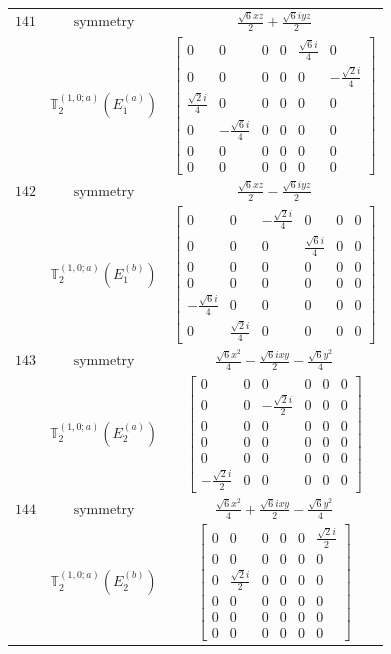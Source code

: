 \documentclass[fleqn,8pt,landscape]{jsarticle}
\begin{document}
\begin{longtable}{ccc}
$ 141 $ & $ \text{symmetry} $ & $ \frac{\sqrt{6} x z}{2} + \frac{\sqrt{6} i y z}{2} $ \\
$  $ & $ \mathbb{T}_{2}^{(1,0;a)}(E_{1}^{(a)}) $ & $ \begin{bmatrix} 0 & 0 & 0 & 0 & \frac{\sqrt{6} i}{4} & 0 \\ 0 & 0 & 0 & 0 & 0 & - \frac{\sqrt{2} i}{4} \\ \frac{\sqrt{2} i}{4} & 0 & 0 & 0 & 0 & 0 \\ 0 & - \frac{\sqrt{6} i}{4} & 0 & 0 & 0 & 0 \\ 0 & 0 & 0 & 0 & 0 & 0 \\ 0 & 0 & 0 & 0 & 0 & 0 \end{bmatrix} $ \\ \hline
$ 142 $ & $ \text{symmetry} $ & $ \frac{\sqrt{6} x z}{2} - \frac{\sqrt{6} i y z}{2} $ \\
$  $ & $ \mathbb{T}_{2}^{(1,0;a)}(E_{1}^{(b)}) $ & $ \begin{bmatrix} 0 & 0 & - \frac{\sqrt{2} i}{4} & 0 & 0 & 0 \\ 0 & 0 & 0 & \frac{\sqrt{6} i}{4} & 0 & 0 \\ 0 & 0 & 0 & 0 & 0 & 0 \\ 0 & 0 & 0 & 0 & 0 & 0 \\ - \frac{\sqrt{6} i}{4} & 0 & 0 & 0 & 0 & 0 \\ 0 & \frac{\sqrt{2} i}{4} & 0 & 0 & 0 & 0 \end{bmatrix} $ \\ \hline
$ 143 $ & $ \text{symmetry} $ & $ \frac{\sqrt{6} x^{2}}{4} - \frac{\sqrt{6} i x y}{2} - \frac{\sqrt{6} y^{2}}{4} $ \\
$  $ & $ \mathbb{T}_{2}^{(1,0;a)}(E_{2}^{(a)}) $ & $ \begin{bmatrix} 0 & 0 & 0 & 0 & 0 & 0 \\ 0 & 0 & - \frac{\sqrt{2} i}{2} & 0 & 0 & 0 \\ 0 & 0 & 0 & 0 & 0 & 0 \\ 0 & 0 & 0 & 0 & 0 & 0 \\ 0 & 0 & 0 & 0 & 0 & 0 \\ - \frac{\sqrt{2} i}{2} & 0 & 0 & 0 & 0 & 0 \end{bmatrix} $ \\ \hline
$ 144 $ & $ \text{symmetry} $ & $ \frac{\sqrt{6} x^{2}}{4} + \frac{\sqrt{6} i x y}{2} - \frac{\sqrt{6} y^{2}}{4} $ \\
$  $ & $ \mathbb{T}_{2}^{(1,0;a)}(E_{2}^{(b)}) $ & $ \begin{bmatrix} 0 & 0 & 0 & 0 & 0 & \frac{\sqrt{2} i}{2} \\ 0 & 0 & 0 & 0 & 0 & 0 \\ 0 & \frac{\sqrt{2} i}{2} & 0 & 0 & 0 & 0 \\ 0 & 0 & 0 & 0 & 0 & 0 \\ 0 & 0 & 0 & 0 & 0 & 0 \\ 0 & 0 & 0 & 0 & 0 & 0 \end{bmatrix} $ \\ \hline

\end{longtable}
\end{document}
